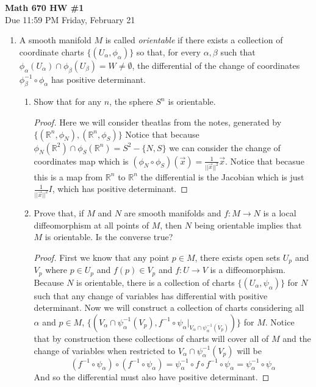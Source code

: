 \documentclass[11pt]{article}
\theoremstyle{definition}
\theoremstyle{definition}
\newcommand{\R}{{\mathbb R}}
\begin{document}
\begin{center}
{\Large\textbf{Math 670 HW \#1}}\\
Due 11:59 PM Friday, February 21
\end{center}




\begin{enumerate}	
	
	\item A smooth manifold $M$ is called \emph{orientable} if there exists a collection of coordinate 
    charts $\{(U_\alpha, \phi_\alpha)\}$ so that, for every $\alpha, \beta$ such that 
    $\phi_\alpha(U_\alpha) \cap \phi_\beta(U_\beta) = W \neq \emptyset$, the differential of the change of 
    coordinates $\phi_\beta^{-1} \circ \phi_\alpha$ has positive determinant.
	
	\begin{enumerate}
		\item Show that for any $n$, the sphere $S^n$ is orientable.
		\begin{proof}
            Here we will consider theatlas from the notes, generated by $\{(\R^n,\phi_N),(\R^n,\phi_S)\}$
            Notice that because $\phi_N(\R^2)\cap\phi_S(\R^n)=S^2-\{N,S\}$ we can consider the change of coordinates 
            map which is $(\phi_N\circ \phi_S)(\vec{x})=\frac{1}{||\vec x||^2}\vec x$.
            Notice that becasue this is a map from $\R^n$ to $\R^n$ the differential is the Jacobian 
            which is just $\frac{1}{||\vec x||^2}I$, which has positive determinant.

        \end{proof}		
		\item Prove that, if $M$ and $N$ are smooth manifolds and $f: M \to N$ is a local diffeomorphism at all points of $M$, then $N$ being orientable implies that $M$ is orientable. Is the converse true?
        \begin{proof}
			First we know that any point $p\in M$, there exists open sets $U_p$ and $V_{p}$ where $p\in U_p$ and 
			$f(p)\in V_p$ and $f:U\rightarrow V$ is a diffeomorphism.
            Because $N$ is orientable, there is a collection of charts $\{(U_\alpha,\psi_\alpha)\}$ for $N$ such that any change of variables has differential with 
            positive determinant. 
            Now we will construct a collection of charts considering all $\alpha$ and $p\in M$, $\{(V_\alpha\cap \psi_\alpha^{-1}(V_p),f^{-1}\circ\psi_\alpha|_{V_\alpha\cap\psi_\alpha^{-1}(V_p)})\}$ for $M$.
			Notice that by construction these collections of charts will cover all of $M$ and the change of variables when restricted to $V_\alpha\cap \psi_\alpha^{-1}(V_p)$ will be
			\[(f^{-1}\circ\psi_\alpha)\circ (f^{-1}\circ\psi_\alpha)=\psi_\alpha^{-1}\circ f\circ f^{-1}\circ\psi_\alpha=\psi_\alpha^{-1}\circ \psi_\alpha\] 
			And so the differential must also have positive determinant.


\end{proof}
\end{enumerate}
\end{enumerate}
\end{document}
